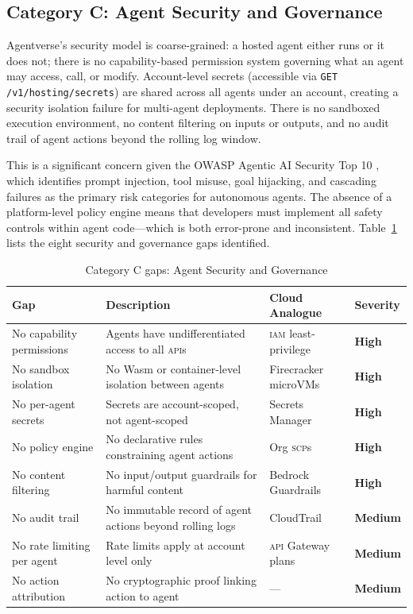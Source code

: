 \documentclass[twoside,11pt]{article}
\newcommand{\high}{\textcolor{red!70!black}{\textbf{High}}}
\newcommand{\medium}{\textcolor{orange!80!black}{\textbf{Medium}}}
\begin{document}
\subsection{Category C: Agent Security and Governance}
\label{subsec:gap-security}

Agentverse's security model is coarse-grained: a hosted agent either runs or
it does not; there is no capability-based permission system governing what an
agent may access, call, or modify.  Account-level secrets (accessible via
\texttt{GET /v1/hosting/secrets}) are shared across all agents under an
account, creating a security isolation failure for multi-agent deployments.
There is no sandboxed execution environment, no content filtering on inputs or
outputs, and no audit trail of agent actions beyond the rolling log window.

This is a significant concern given the OWASP Agentic AI Security Top 10
\citep{owasp2025agentic}, which identifies prompt injection, tool misuse, goal
hijacking, and cascading failures as the primary risk categories for autonomous
agents.  The absence of a platform-level policy engine means that developers
must implement all safety controls within agent code---which is both
error-prone and inconsistent.  Table~\ref{tab:gap-security} lists the eight
security and governance gaps identified.

\begin{table}[htbp]
\centering
\caption{Category C gaps: Agent Security and Governance}
\label{tab:gap-security}
\begin{tabular}{p{3.2cm} p{5.5cm} p{2.9cm} l}
\toprule
\textbf{Gap} & \textbf{Description} & \textbf{Cloud Analogue} &
\textbf{Severity} \\
\midrule
No capability permissions & Agents have undifferentiated access to all
\textsc{api}s & \textsc{iam} least-privilege & \high \\[4pt]
No sandbox isolation & No Wasm or container-level isolation between agents &
Firecracker microVMs & \high \\[4pt]
No per-agent secrets & Secrets are account-scoped, not agent-scoped & Secrets
Manager & \high \\[4pt]
No policy engine & No declarative rules constraining agent actions & Org
\textsc{scp}s & \high \\[4pt]
No content filtering & No input/output guardrails for harmful content & Bedrock
Guardrails & \high \\[4pt]
No audit trail & No immutable record of agent actions beyond rolling logs &
CloudTrail & \medium \\[4pt]
No rate limiting per agent & Rate limits apply at account level only & \textsc{api}
Gateway plans & \medium \\[4pt]
No action attribution & No cryptographic proof linking action to agent & --- &
\medium \\
\bottomrule
\end{tabular}
\end{table}
\end{document}
